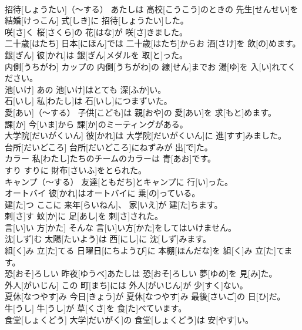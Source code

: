 \documentclass[8pt]{extreport}
\begin{document}
\begin{CJK}{UTF8}{min}
\\	招待[しょうたい]（～する）	あたしは 高校[こうこう]のときの 先生[せんせい]を 結婚[けっこん] 式[しき]に 招待[しょうたい]した。		
\\	咲[さ]く	桜[さくら]の 花[はな]が 咲[さ]きました。		
\\	二十歳[はたち]	日本[にほん]では 二十歳[はたち]からお 酒[さけ]を 飲[の]めます。		
\\	銀[ぎん]	彼[かれ]は 銀[ぎん]メダルを 取[と]った。		
\\	内側[うちがわ]	カップの 内側[うちがわ]の 線[せん]までお 湯[ゆ]を 入[い]れてください。		
\\	池[いけ]	あの 池[いけ]はとても 深[ふか]い。		
\\	石[いし]	私[わたし]は 石[いし]につまずいた。		
\\	愛[あい]（～する）	子供[こども]は 親[おや]の 愛[あい]を 求[もと]めます。		
\\	課[か]	今[いま]から 課[か]のミーティングがある。		
\\	大学院[だいがくいん]	彼[かれ]は 大学院[だいがくいん]に 進[すす]みました。		
\\	台所[だいどころ]	台所[だいどころ]にねずみが 出[で]た。		
\\	カラー	私[わたし]たちのチームのカラーは 青[あお]です。		
\\	すり	すりに 財布[さいふ]をとられた。		
\\	キャンプ（～する）	友達[ともだち]とキャンプに 行[い]った。		
\\	オートバイ	彼[かれ]はオートバイに 乗[の]っている。		
\\	建[た]つ	ここに 来年[らいねん]、 家[いえ]が 建[た]ちます。		
\\	刺[さ]す	蚊[か]に 足[あし]を 刺[さ]された。		
\\	言[い]い 方[かた]	そんな 言[い]い方[かた]をしてはいけません。		
\\	沈[しず]む	太陽[たいよう]は 西[にし]に 沈[しず]みます。		
\\	組[く]み 立[た]てる	日曜日[にちようび]に 本棚[ほんだな]を 組[く]み 立[た]てます。		
\\	恐[おそ]ろしい	昨夜[ゆうべ]あたしは 恐[おそ]ろしい 夢[ゆめ]を 見[み]た。		
\\	外人[がいじん]	この 町[まち]には 外人[がいじん]が 少[すく]ない。		
\\	夏休[なつやす]み	今日[きょう]が 夏休[なつやす]み 最後[さいご]の 日[ひ]だ。		
\\	牛[うし]	牛[うし]が 草[くさ]を 食[た]べています。		
\\	食堂[しょくどう]	大学[だいがく]の 食堂[しょくどう]は 安[やす]い。		

\end{CJK}
\end{document}
